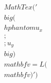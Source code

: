 \documentclass[preview]{standalone}
\begin{document}
\begin{align*}
MathTex('\\big( \\hphantom{u_x} \\;\\; u_y \\big) \\mathbf{v} = L ( \\mathbf{v} )')
\end{align*}
\end{document}
